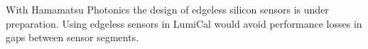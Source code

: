 With Hamamatsu Photonics the design of
edgeless silicon sensors is under preparation. Using edgeless sensors in LumiCal would avoid performance losses
in gaps between sensor segments.



%
%

